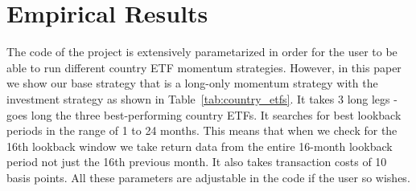 \documentclass[a4paper,12pt,twoside]{article}
\begin{document}
\newpage
\section{Empirical Results}

The code of the project is extensively parametarized in order for the user to be able to run different country ETF momentum strategies. However, in this paper we show our base strategy that is a long-only momentum strategy with the investment strategy as shown in Table~\ref{tab:country_etfs}. It takes 3 long legs - goes long the three best-performing country ETFs. It searches for best lookback periods in the range of 1 to 24 months. This means that when we check for the 16th lookback window we take return data from the entire 16-month lookback period not just the 16th previous month.  It also takes transaction costs of 10 basis points. All these parameters are adjustable in the code if the user so wishes.
\end{document}
